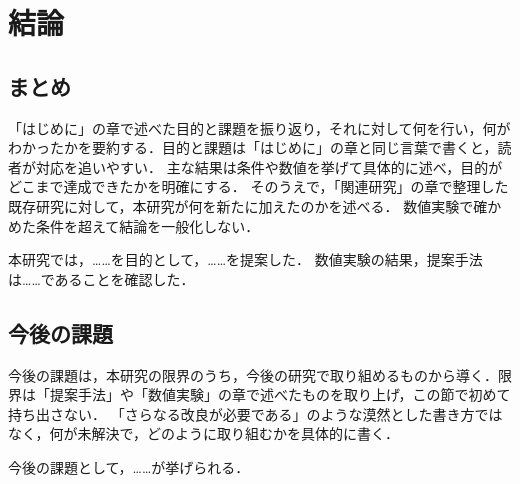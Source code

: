 \chapter{結論}
\label{chap:conclusion}

\section{まとめ}
\label{sec:summary}

\begin{writingnote}
「はじめに」の章で述べた目的と課題を振り返り，それに対して何を行い，何がわかったかを要約する．目的と課題は「はじめに」の章と同じ言葉で書くと，読者が対応を追いやすい．
主な結果は条件や数値を挙げて具体的に述べ，目的がどこまで達成できたかを明確にする．
そのうえで，「関連研究」の章で整理した既存研究に対して，本研究が何を新たに加えたのかを述べる．
数値実験で確かめた条件を超えて結論を一般化しない．
\end{writingnote}

本研究では，……を目的として，……を提案した．
数値実験の結果，提案手法は……であることを確認した．

\section{今後の課題}
\label{sec:future-work}

\begin{writingnote}
今後の課題は，本研究の限界のうち，今後の研究で取り組めるものから導く．限界は「提案手法」や「数値実験」の章で述べたものを取り上げ，この節で初めて持ち出さない．
「さらなる改良が必要である」のような漠然とした書き方ではなく，何が未解決で，どのように取り組むかを具体的に書く．
\end{writingnote}

今後の課題として，……が挙げられる．
